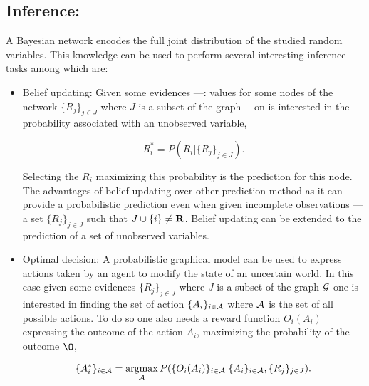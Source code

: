 \documentclass[a4paper,11pt]{report}
\begin{document}
    \subsection{Inference:}
      \label{subsec:PGMs/BN/Inference}
      
			A Bayesian network encodes the full joint distribution of the studied random variables. This knowledge can be used to perform several interesting inference tasks among which are:\\
				
     \begin{itemize}
        \item Belief updating: Given some evidences ---\ie: values for some nodes of the network $\{R_{j}\}_{j \in J}$ where $J$ is a subset of the graph--- on is interested in the probability associated with an unobserved variable,
        
        \begin{equation}
					R_{i}^{\ast} = P(R_{i}|\{R_{j}\}_{j \in J}).
					\label{eq:BN inference BEL}
				\end{equation}
				
				Selecting the $R_{i}$ maximizing this probability is the prediction for this node. The advantages of belief updating over other prediction method as it can provide a probabilistic prediction even when given incomplete observations ---\ie a set $\{R_{j}\}_{j \in J}$ such that $J \cup \{i\} \neq {\bf R}$. Belief updating can be extended to the prediction of a set of unobserved variables.\\
				
				\item Optimal decision: A probabilistic graphical model can be used to express actions taken by an agent to modify the state of an uncertain world. In this case given some evidences $\{R_{j}\}_{j \in J}$ where $J$ is a subset of the graph $\mathcal{G}$ one is interested in finding the set of action $\{A_{i}\}_{i \in \mathcal{A}}$ where $\mathcal{A}$ is the set of all possible actions. To do so one also needs a reward function $O_{i}(A_{i})$ expressing the outcome of the action $A_{i}$,  maximizing the probability of the outcome $\O$,

				\begin{equation}
					\{A_{i}^{\ast}\}_{i \in \mathcal{A}} =\mathop{\rm argmax}_{\mathcal{A}} P(\{O_{i}(A_{i})\}_{i \in \mathcal{A}} | \{A_{i}\}_{i \in \mathcal{A}}, \{R_{j}\}_{j \in J}).
					\label{eq:BN inference optimal decision}
				\end{equation}
				

\end{itemize}
\end{document}
